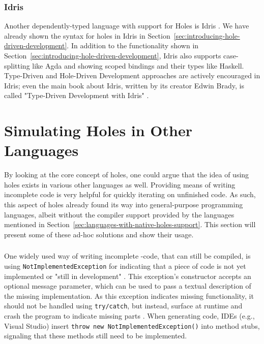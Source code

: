 \subsubsection{Idris}
Another dependently-typed language with support for Holes is Idris \cite{brady_type-driven_2017}.
We have already shown the syntax for holes in Idris in Section~\ref{sec:introducing-hole-driven-development}.
In addition to the functionality shown in Section~\ref{sec:introducing-hole-driven-development}, Idris also supports case-splitting like Agda and showing scoped bindings and their types like Haskell.
Type-Driven and Hole-Driven Development approaches are actively encouraged in Idris; even the main book about Idris, written by its creator Edwin Brady, is called "Type-Driven Development with Idris" \cite{brady_type-driven_2017}.

\section{Simulating Holes in Other Languages}
\label{sec:simulating-holes}
By looking at the core concept of holes, one could argue that the idea of using holes exists in various other languages as well.
Providing means of writing incomplete code is very helpful for quickly iterating on unfinished code.
As such, this aspect of holes already found its way into general-purpose programming languages, albeit without the compiler support provided by the languages mentioned in Section~\ref{sec:languages-with-native-holes-support}.
This section will present some of these ad-hoc solutions and show their usage.

\subsubsection{\CS}
One widely used way of writing incomplete \CS-code, that can still be compiled, is using \texttt{NotImplementedException} \cite{microsoft_notimplementedexception_2020} for indicating that a piece of code is not yet implemented or "still in development" \cite{microsoft_notimplementedexception_2020}.
This exception's constructor accepts an optional message parameter, which can be used to pass a textual description of the missing implementation.
As this exception indicates missing functionality, it should not be handled using \texttt{try/catch}, but instead, surface at runtime and crash the program to indicate missing parts \cite{microsoft_notimplementedexception_2020}.
When generating code, IDEs (e.g., Visual Studio) insert \texttt{throw new NotImplementedException()} into method stubs, signaling that these methods still need to be implemented.

